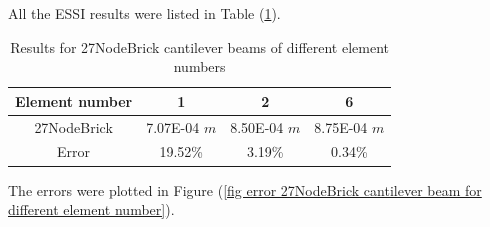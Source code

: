 \documentclass[fleqn,11pt]{article}
\begin{document}




All the ESSI results were listed in Table (\ref{table 27NodeBrick cantilever beams results for different element number}). 
\begin{table}[H]
  \centering
      \caption{Results for 27NodeBrick cantilever beams of different element numbers}
    \label{table 27NodeBrick cantilever beams results for different element number}
    \begin{tabular}{|c|c|c|c|}
      \hline
      Element number & 1        & 2        & 6         \\  \hline
      27NodeBrick     & 7.07E-04 $m$ & 8.50E-04 $m$ & 8.75E-04 $m$     \\ \hline
      Error           & 19.52\% & 3.19\% & 0.34\%    \\ 
      \hline 
    \end{tabular}
\end{table}



The errors were plotted in Figure (\ref{fig error 27NodeBrick cantilever beam for different element number}).
\end{document}
